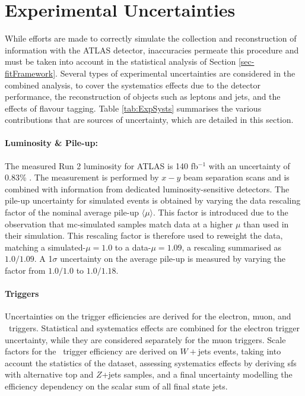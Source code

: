 \section{Experimental Uncertainties}\label{sec-unc} %
While efforts are made to correctly simulate the collection and reconstruction of information with the ATLAS detector, inaccuracies permeate this procedure and must be taken into account in the statistical analysis of Section \ref{sec-fitFramework}. Several types of experimental uncertainties are considered in the combined analysis, to cover the systematics effects due to the detector performance, the reconstruction of objects such as leptons and jets, and the effects of flavour tagging. Table \ref{tab:ExpSysts} summarises the various contributions that are sources of uncertainty, which are detailed in this section.


\paragraph{Luminosity \& Pile-up:} The measured Run 2 luminosity for ATLAS is 140 fb$^{-1}$ with an uncertainty of 0.83\% \cite{ATLAS:2022hro}. The measurement is performed by $x-y$ beam separation scans and is combined with information from dedicated luminosity-sensitive detectors. The pile-up uncertainty for simulated events is obtained by varying the data rescaling factor of the nominal average pile-up $\langle \mu \rangle$. This factor is introduced due to the observation that \gls{mc}-simulated samples match data at a higher $\mu$ than used in their simulation. This rescaling factor is therefore used to reweight the data, matching a simulated-$\mu = 1.0$ to a data-$\mu = 1.09$, a rescaling summarised as $1.0/1.09$. A 1$\sigma$ uncertainty on the average pile-up is measured by varying the factor from $1.0/1.0$ to $1.0/1.18$. %

\paragraph{Triggers} Uncertainties on the trigger efficiencies are derived for the electron, muon, and \etm\ triggers. Statistical and systematics effects are combined for the electron trigger uncertainty, while they are considered separately for the muon triggers. Scale factors for the \etm\ trigger efficiency are derived on $W+$jets events, taking into account the statistics of the dataset, assessing systematics effects by deriving \glspl{sf} with alternative top and $Z$+jets samples, and a final uncertainty modelling the efficiency dependency on the scalar sum of all final state jets. %

